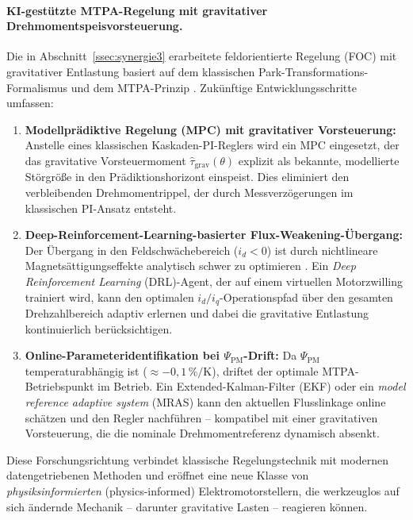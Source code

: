 ﻿\documentclass[12pt, a4paper]{report}
\theoremstyle{definition}
\theoremstyle{remark}
\begin{document}
\paragraph{KI-gestützte MTPA-Regelung mit gravitativer
Drehmomentspeisvorsteuerung.}
Die in Abschnitt~\ref{ssec:synergie3} erarbeitete feldorientierte Regelung (FOC)
mit gravitativer Entlastung basiert auf dem klassischen Park-Transformations-Formalismus
\cite{park1929} und dem MTPA-Prinzip \cite{morimoto2006}. Zukünftige
Entwicklungsschritte umfassen:
\begin{enumerate}[label=\arabic*.]
  \item \textbf{Modellprädiktive Regelung (MPC) mit gravitativer Vorsteuerung:}
        Anstelle eines klassischen Kaskaden-PI-Reglers \cite{vas1990} wird ein MPC
        eingesetzt, der das gravitative Vorsteuermoment $\hat\tau_{\text{grav}}(\theta)$
        explizit als bekannte, modellierte Störgröße in den Prädiktionshorizont
        einspeist. Dies eliminiert den verbleibenden Drehmomentrippel, der durch
        Messverzögerungen im klassischen PI-Ansatz entsteht.
  \item \textbf{Deep-Reinforcement-Learning-basierter Flux-Weakening-Übergang:}
        Der Übergang in den Feldschwächebereich ($i_d < 0$) ist durch nichtlineare
        Magnetsättigungseffekte analytisch schwer zu optimieren \cite{bose2002}.
        Ein \emph{Deep Reinforcement Learning} (DRL)-Agent, der auf einem virtuellen
        Motorzwilling trainiert wird, kann den optimalen $i_d/i_q$-Operationspfad
        über den gesamten Drehzahlbereich adaptiv erlernen und dabei die gravitative
        Entlastung kontinuierlich berücksichtigen.
  \item \textbf{Online-Parameteridentifikation bei $\Psi_{\text{PM}}$-Drift:}
        Da $\Psi_{\text{PM}}$ temperaturabhängig ist ($\approx -0{,}1\,\%/\text{K}$),
        driftet der optimale MTPA-Betriebspunkt im Betrieb. Ein Extended-Kalman-Filter
        (EKF) oder ein \emph{model reference adaptive system} (MRAS) kann den
        aktuellen Flusslinkage online schätzen und den Regler nachführen --
        kompatibel mit einer gravitativen Vorsteuerung, die die nominale
        Drehmomentreferenz dynamisch absenkt.
\end{enumerate}
Diese Forschungsrichtung verbindet klassische Regelungstechnik \cite{park1929,
vas1990} mit modernen datengetriebenen Methoden und eröffnet eine neue Klasse
von \emph{physiksinformierten} (physics-informed) Elektromotorstellern, die
werkzeuglos auf sich ändernde Mechanik -- darunter gravitative Lasten -- reagieren
können.
\end{document}
